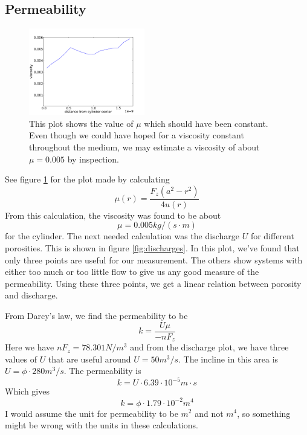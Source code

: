 \documentclass[reprint,floatfix,amsmath,amssymb,aps,pra]{revtex4-1}
\begin{document}
\subsection{Permeability}
%
\begin{figure}
  \centering
  \includegraphics[width=0.45\textwidth]{../analysis/1j-cylinder-force/runs/2013-04-05_201107/viscosity.pdf}
  \caption{This plot shows the value of $\mu$ which should have been constant. Even though we could have hoped for a viscosity constant throughout the medium, we may estimate a viscosity of about $\mu = 0.005$ by inspection.}
  \label{fig:viscosity-plot}
\end{figure}
%
%
See figure \ref{fig:viscosity-plot} for the plot made by calculating
\begin{equation}
  \mu(r) = \frac{F_{z}(a^2 - r^2)}{4 u(r)}
\end{equation}
%
From this calculation, the viscosity was found to be about
%
\begin{equation}
  \mu = 0.005 \unit{kg/(s\cdot m)}
\end{equation} 
%
for the cylinder.
%
The next needed calculation was the discharge $U$ for different porosities. This is shown in figure \ref{fig:discharges}. In this plot, we've found that only three points are useful for our measurement. The others show systems with either too much or too little flow to give us any good measure of the permeability. Using these three points, we get a linear relation between porosity and discharge.

From Darcy's law, we find the permeability to be
\begin{equation}
  k = \frac{U\mu}{-nF_z}
\end{equation} 
Here we have $nF_z = 78.301 \unit{N/m^{3}}$ and from the discharge plot, we have three values of $U$ that are useful around $U = 50 \unit{m^{3}/ s}$. The incline in this area is $U = \phi \cdot 280 \unit{m^3/s}$. The permeability is
\begin{equation}
  k = U \cdot 6.39 \cdot 10^{-5} \unit{m \cdot s}
\end{equation} 
Which gives
\begin{equation}
  k =  \phi\cdot 1.79 \cdot 10^{-2} \unit{m^4}
\end{equation} 
I would assume the unit for permeability to be $\unit{m^{2}}$ and not $\unit{m^{4}}$, so something might be wrong with the units in these calculations.
\end{document}
